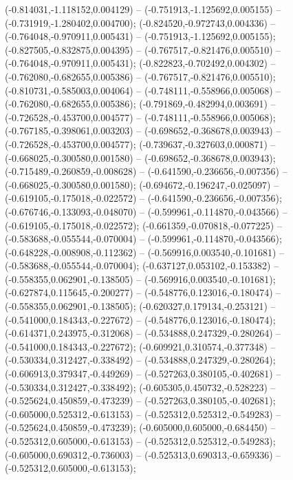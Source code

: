  (-0.814031,-1.118152,0.004129) -- (-0.751913,-1.125692,0.005155) -- (-0.731919,-1.280402,0.004700);
 (-0.824520,-0.972743,0.004336) -- (-0.764048,-0.970911,0.005431) -- (-0.751913,-1.125692,0.005155);
 (-0.827505,-0.832875,0.004395) -- (-0.767517,-0.821476,0.005510) -- (-0.764048,-0.970911,0.005431);
 (-0.822823,-0.702492,0.004302) -- (-0.762080,-0.682655,0.005386) -- (-0.767517,-0.821476,0.005510);
 (-0.810731,-0.585003,0.004064) -- (-0.748111,-0.558966,0.005068) -- (-0.762080,-0.682655,0.005386);
 (-0.791869,-0.482994,0.003691) -- (-0.726528,-0.453700,0.004577) -- (-0.748111,-0.558966,0.005068);
 (-0.767185,-0.398061,0.003203) -- (-0.698652,-0.368678,0.003943) -- (-0.726528,-0.453700,0.004577);
 (-0.739637,-0.327603,0.000871) -- (-0.668025,-0.300580,0.001580) -- (-0.698652,-0.368678,0.003943);
 (-0.715489,-0.260859,-0.008628) -- (-0.641590,-0.236656,-0.007356) -- (-0.668025,-0.300580,0.001580);
 (-0.694672,-0.196247,-0.025097) -- (-0.619105,-0.175018,-0.022572) -- (-0.641590,-0.236656,-0.007356);
 (-0.676746,-0.133093,-0.048070) -- (-0.599961,-0.114870,-0.043566) -- (-0.619105,-0.175018,-0.022572);
 (-0.661359,-0.070818,-0.077225) -- (-0.583688,-0.055544,-0.070004) -- (-0.599961,-0.114870,-0.043566);
 (-0.648228,-0.008908,-0.112362) -- (-0.569916,0.003540,-0.101681) -- (-0.583688,-0.055544,-0.070004);
 (-0.637127,0.053102,-0.153382) -- (-0.558355,0.062901,-0.138505) -- (-0.569916,0.003540,-0.101681);
 (-0.627874,0.115645,-0.200277) -- (-0.548776,0.123016,-0.180474) -- (-0.558355,0.062901,-0.138505);
 (-0.620327,0.179134,-0.253121) -- (-0.541000,0.184343,-0.227672) -- (-0.548776,0.123016,-0.180474);
 (-0.614371,0.243975,-0.312068) -- (-0.534888,0.247329,-0.280264) -- (-0.541000,0.184343,-0.227672);
 (-0.609921,0.310574,-0.377348) -- (-0.530334,0.312427,-0.338492) -- (-0.534888,0.247329,-0.280264);
 (-0.606913,0.379347,-0.449269) -- (-0.527263,0.380105,-0.402681) -- (-0.530334,0.312427,-0.338492);
 (-0.605305,0.450732,-0.528223) -- (-0.525624,0.450859,-0.473239) -- (-0.527263,0.380105,-0.402681);
 (-0.605000,0.525312,-0.613153) -- (-0.525312,0.525312,-0.549283) -- (-0.525624,0.450859,-0.473239);
 (-0.605000,0.605000,-0.684450) -- (-0.525312,0.605000,-0.613153) -- (-0.525312,0.525312,-0.549283);
 (-0.605000,0.690312,-0.736003) -- (-0.525313,0.690313,-0.659336) -- (-0.525312,0.605000,-0.613153);
